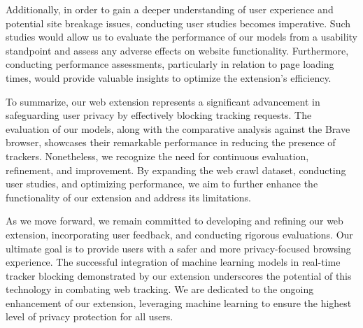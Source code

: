 Additionally, in order to gain a deeper understanding of user experience and potential site breakage issues, conducting user studies
becomes imperative. Such studies would allow us to evaluate the performance of our models from a usability standpoint and assess any
adverse effects on website functionality. Furthermore, conducting performance assessments, particularly in relation to page loading
times, would provide valuable insights to optimize the extension's efficiency.

To summarize, our web extension represents a significant advancement in safeguarding user privacy by effectively blocking tracking
requests. The evaluation of our models, along with the comparative analysis against the Brave browser, showcases their remarkable
performance in reducing the presence of trackers. Nonetheless, we recognize the need for continuous evaluation, refinement, and
improvement. By expanding the web crawl dataset, conducting user studies, and optimizing performance, we aim to further enhance
the functionality of our extension and address its limitations.

As we move forward, we remain committed to developing and refining our web extension, incorporating user feedback, and conducting
rigorous evaluations. Our ultimate goal is to provide users with a safer and more privacy-focused browsing experience. The successful
integration of machine learning models in real-time tracker blocking demonstrated by our extension underscores the potential of this
technology in combating web tracking. We are dedicated to the ongoing enhancement of our extension, leveraging machine learning to
ensure the highest level of privacy protection for all users.


